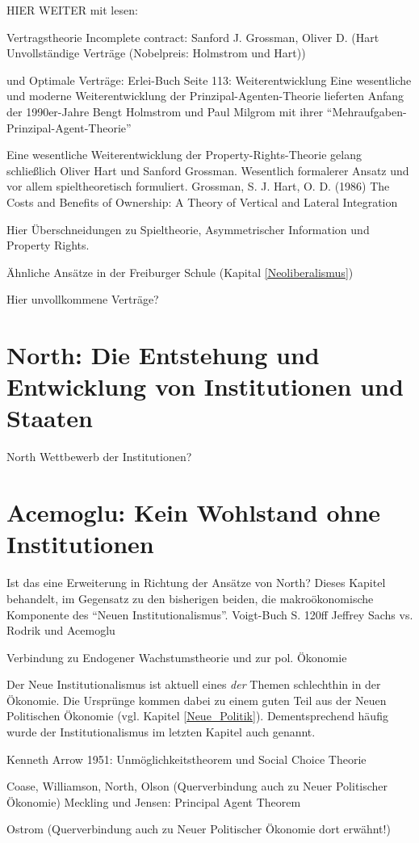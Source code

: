 \textcite{Hart1990}




HIER WEITER mit lesen: \textcite{Hart2016}


\parencite{Nobelpreis-Komitee2016}
Vertragstheorie Incomplete contract: Sanford J. Grossman, Oliver D. (Hart Unvollständige Verträge (Nobelpreis: Holmstrom und Hart))

und
Optimale Verträge: 
Erlei-Buch Seite 113: Weiterentwicklung
Eine wesentliche und moderne Weiterentwicklung der Prinzipal-Agenten-Theorie lieferten Anfang der 1990er-Jahre Bengt Holmstrom und Paul Milgrom mit ihrer "`Mehraufgaben-Prinzipal-Agent-Theorie"' 


Eine wesentliche Weiterentwicklung der Property-Rights-Theorie gelang schließlich Oliver Hart und Sanford Grossman. Wesentlich formalerer Ansatz und vor allem spieltheoretisch formuliert. Grossman, S. J. Hart, O. D. (1986) The Costs and Benefits of Ownership: A Theory of Vertical and Lateral Integration

Hier Überschneidungen zu Spieltheorie, Asymmetrischer Information und Property Rights.





Ähnliche Ansätze in der Freiburger Schule (Kapital \ref{Neoliberalismus})

Hier unvollkommene Verträge?



\section{North: Die Entstehung und Entwicklung von Institutionen und Staaten}
North
Wettbewerb der Institutionen?



\section{Acemoglu: Kein Wohlstand ohne Institutionen}

Ist das eine Erweiterung in Richtung der Ansätze von North?
Dieses Kapitel behandelt, im Gegensatz zu den bisherigen beiden, die makroökonomische Komponente des "`Neuen Institutionalismus"'. 
Voigt-Buch S. 120ff
Jeffrey Sachs vs. Rodrik und Acemoglu



Verbindung zu Endogener Wachstumstheorie \textcite[S. 633ff]{Snowdon2005} und zur pol. Ökonomie \textcite[S. 562]{Snowdon2005}

Der Neue Institutionalismus ist aktuell eines \textit{der} Themen schlechthin in der Ökonomie. Die Ursprünge kommen dabei zu einem guten Teil aus der Neuen Politischen Ökonomie (vgl. Kapitel \ref{Neue_Politik}). Dementsprechend häufig wurde der Institutionalismus im letzten Kapitel auch genannt.





Kenneth Arrow 1951: Unmöglichkeitstheorem und Social Choice Theorie




Coase, Williamson, North, Olson (Querverbindung auch zu Neuer Politischer Ökonomie)
Meckling und Jensen: Principal Agent Theorem



Ostrom (Querverbindung auch zu Neuer Politischer Ökonomie dort erwähnt!)



